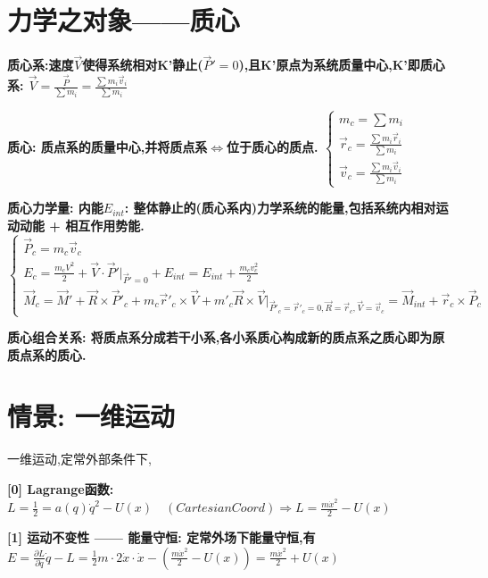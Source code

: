     \section{力学之对象——质心}
        \bf{质心系}:\exists 速度$\vec V$使得系统相对K'静止($\vec P' = 0$),且K'原点为系统质量中心,K'即质心系:
            $\vec V = \frac{\vec P}{\sum m_i} = \frac{\sum m_i \vec v_i}{\sum m_i}$
            
        \bf{质心}: 质点系的质量中心,并将质点系$\Leftrightarrow$位于质心的质点.
            $
                \left\{ \begin{array}{ll}
                m_c = \sum m_i\\
                \vec r_c = \frac{\sum m_i \vec r_i}{\sum m_i}\\
                \vec v_c = \frac{\sum m_i \vec v_i}{\sum m_i}
                \end{array} \right.
            $
            
        \bf{质心力学量}:
            内能$E_{int}$: 整体静止的(质心系内)力学系统的能量,包括系统内相对运动动能 + 相互作用势能.\\
            $
                \left\{ \begin{array}{ll}
                \vec P_c = m_c \vec v_c\\
                E_c = \frac{m_c V^2}{2} + \vec V \cdot \vec P' |_{\vec P'=0} + E_{int} = E_{int} + \frac{m_c v_c^2}{2}\\
                \vec M_c = \vec M' + \vec R \times \vec P'_c + m_c \vec r'_c \times \vec V + m'_c \vec R \times \vec V|_{\vec P'_c =\vec r'_c = 0, \vec R =\vec r_c, \vec V =\vec v_c} = \vec M_{int} + \vec r_c \times \vec P_c 
                \end{array} \right.
            $
            
        \bf{质心组合关系}: 将质点系分成若干小系,各小系质心构成新的质点系之质心即为原质点系的质心.


    \section{情景: 一维运动}
        一维运动,定常外部条件下,
        
        \bf{[0] Lagrange函数}:
            $L = \frac{1}{2} = a(q) \dot q^2 - U(x)\quad (CartesianCoord)\Rightarrow L = \frac{m \dot x^2}{2} - U(x)$
        
        \bf{[1] 运动不变性 —— 能量守恒}: 定常外场下能量守恒,有
            $E = \frac{\partial L}{\partial \dot q}\dot q - L = \frac{1}{2}m\cdot 2 \dot x \cdot \dot x - (\frac{m \dot x^2}{2} - U(x)) = \frac{m \dot x^2}{2} + U(x) $
        
